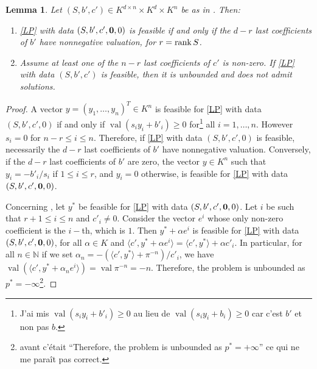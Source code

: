 \documentclass[a4paper,oneside,11pt]{article}
\newtheorem{lemma}[theorem]{Lemma}
\newcommand{\simone}[1]{{\color{blue} #1}} %
\newcommand{\corentin}[1]{{\color{red} #1}} %
\DeclareMathOperator{\val}{val}
\begin{document}
\begin{lemma}\label{prop:reduc}
  Let $(S,b',c') \in K^{d\times n} \times K^d \times K^n$ be as in .
  Then:
  \begin{enumerate}
  \item \label{prop:reduc_it1}
    \eqref{LP} with data $(S,b',c',{\bf 0},0)$ is feasible if and only if the $d-r$ last coefficients
    of $b'$ have nonnegative valuation, for $r = {\rm rank}\,S$.
  \item \label{prop:reduc_it2}
    Assume at least one of the $n-r$ last coefficients of $c'$ is non-zero. If \eqref{LP} with
    data $(S,b',c')$ is feasible, then it is unbounded and does not admit solutions.
  \end{enumerate}
\end{lemma}
\begin{proof}
  A vector $y = (y_1, \ldots, y_n)^T \in K^n$ is feasible for \eqref{LP} with data
  $(S,b',c',0)$ if and only if $\val(s_i y_i + b'_i) \geq 0$ for\footnote{\simone{J'ai mis
    $\val(s_i y_i + b'_i) \geq 0$ au lieu de $\val(s_i y_i + b_i) \geq 0$ car c'est $b'$
    et non pas $b$.}} all $i = 1,\ldots,n$.
  However $s_i = 0$ for $n-r \leq i\leq n$. Therefore, if \eqref{LP} with data $(S,b',c',0)$ is feasible,
  necessarily the $d-r$ last coefficients of $b'$ have nonnegative valuation.
  Conversely, if the $d-r$ last coefficients of $b'$ are zero, the vector $y \in K^n$ such that
  $y_i = {-b'_i}/{s_i}$ if $1 \leq i \leq r$, and $y_i =0$ otherwise, is feasible for \eqref{LP}
  with data $(S,b',c',{\bf 0},0)$.

  Concerning , let $y^*$ be feasible for \eqref{LP} with data $(S,b',c',{\bf 0},0)$.
  Let $i$ be such that $r+1 \leq i \leq n$ and $c'_i \neq 0$. Consider the vector $e^i$ whose only non-zero
  coefficient is the $i-$th, which is $1$. Then $y^* + \alpha e^i$ is feasible for \eqref{LP} with data $(S,b',c',{\bf 0},0)$,
  for all $\alpha \in K$ and $\langle c', y^* + \alpha e^i\rangle = \langle c' , y^* \rangle + \alpha c'_i$.
  In particular, for all $n \in \mathbb{N}$ if we set $\alpha_n = -({\langle c', y^* \rangle + \pi^{-n}})/{c'_i}$,
  we have $\val \left(\langle c', y^* + \alpha_n e ^i \rangle\right) = \val \pi^{-n} = -n$.
  Therefore, the problem is unbounded as $p^* = -\infty$\footnote{\simone{avant c'était ``Therefore, the problem is unbounded as $p^* = +\infty$'' ce qui ne me paraît pas correct.}}.
\end{proof}
\end{document}
